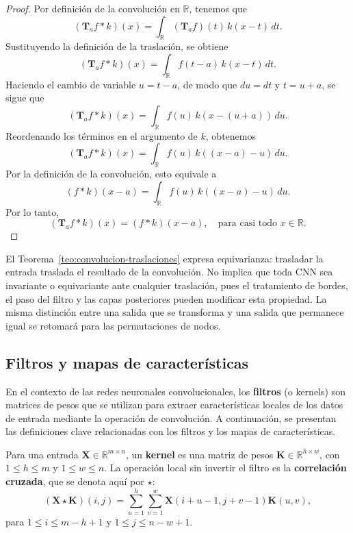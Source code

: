 \begin{proof}
    Por definición de la convolución en $\mathbb{R}$, tenemos que
    \[
        (\mathbf{T}_a f \ast k)(x) = \int_{\mathbb{R}} (\mathbf{T}_a f)(t)\, k(x - t)\,
        dt.
    \]
    Sustituyendo la definición de la traslación, se obtiene
    \[
        (\mathbf{T}_a f \ast k)(x) = \int_{\mathbb{R}} f(t - a)\, k(x - t)\, dt.
    \]
    Haciendo el cambio de variable $u = t - a$, de modo que $du = dt$ y $t = u + a$, se sigue que
    \[
        (\mathbf{T}_a f \ast k)(x) = \int_{\mathbb{R}} f(u)\, k(x - (u + a))\, du.
    \]
    Reordenando los términos en el argumento de $k$, obtenemos
    \[
        (\mathbf{T}_a f \ast k)(x) = \int_{\mathbb{R}} f(u)\, k((x - a) - u)\, du.
    \]
    Por la definición de la convolución, esto equivale a
    \[
        (f \ast k)(x - a) = \int_{\mathbb{R}} f(u)\, k((x - a) - u)\, du.
    \]
    Por lo tanto,
    \[
        (\mathbf{T}_a f \ast k)(x) = (f \ast k)(x - a), \quad \text{para casi todo }x\in\mathbb R.
    \]
\end{proof}
El Teorema~\ref{teo:convolucion-traslaciones} expresa equivarianza: trasladar la entrada traslada el resultado de la convolución. No implica que toda CNN sea invariante o equivariante ante cualquier traslación, pues el tratamiento de bordes, el paso del filtro y las capas posteriores pueden modificar esta propiedad. La misma distinción entre una salida que se transforma y una salida que permanece igual se retomará para las permutaciones de nodos.

\subsection{Filtros y mapas de características}

En el contexto de las redes neuronales convolucionales, los \textbf{filtros} (o kernels) son matrices de pesos que se utilizan para extraer características locales de los datos de entrada mediante la operación de convolución. A continuación, se presentan las definiciones clave relacionadas con los filtros y los mapas de características.

\begin{definition}
\label{def:kernel}
Para una entrada $\mathbf X\in\mathbb R^{m\times n}$, un \textbf{kernel} es una matriz de pesos $\mathbf K\in\mathbb R^{h\times w}$, con $1\leq h\leq m$ y $1\leq w\leq n$. La operación local sin invertir el filtro es la \textbf{correlación cruzada}, que se denota aquí por $\star$:
\[
(\mathbf X\star\mathbf K)(i,j)
=\sum_{u=1}^{h}\sum_{v=1}^{w}\mathbf X(i+u-1,j+v-1)\mathbf K(u,v),
\]
para $1\leq i\leq m-h+1$ y $1\leq j\leq n-w+1$.
\end{definition}

